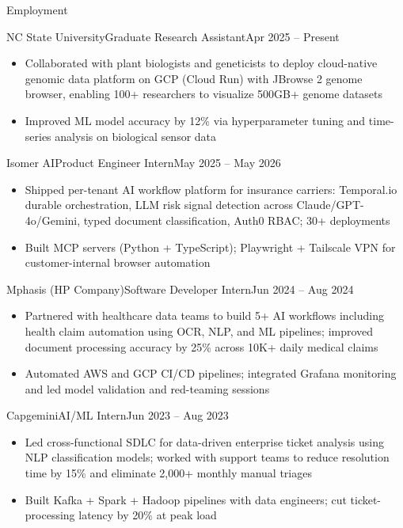 \documentclass{mcdowellcv}
\begin{document}
\fontsize{10}{12}\selectfont
\makeheader

\begin{cvsection}{Employment}

  \begin{cvsubsection}{NC State University}{Graduate Research Assistant}{Apr 2025 -- Present}
    \begin{itemize}
      \item Collaborated with plant biologists and geneticists to deploy cloud-native genomic data platform on GCP (Cloud Run) with JBrowse 2 genome browser, enabling 100+ researchers to visualize 500GB+ genome datasets
      \item Improved ML model accuracy by 12\% via hyperparameter tuning and time-series analysis on biological sensor data
    \end{itemize}
  \end{cvsubsection}

  \begin{cvsubsection}{Isomer AI}{Product Engineer Intern}{May 2025 -- May 2026}
    \begin{itemize}
      \item Shipped per-tenant AI workflow platform for insurance carriers: Temporal.io durable orchestration, LLM risk signal detection across Claude/GPT-4o/Gemini, typed document classification, Auth0 RBAC; 30+ deployments
      \item Built MCP servers (Python + TypeScript); Playwright + Tailscale VPN for customer-internal browser automation
    \end{itemize}
  \end{cvsubsection}

  \begin{cvsubsection}{Mphasis (HP Company)}{Software Developer Intern}{Jun 2024 -- Aug 2024}
    \begin{itemize}
      \item Partnered with healthcare data teams to build 5+ AI workflows including health claim automation using OCR, NLP, and ML pipelines; improved document processing accuracy by 25\% across 10K+ daily medical claims
      \item Automated AWS and GCP CI/CD pipelines; integrated Grafana monitoring and led model validation and red-teaming sessions
    \end{itemize}
  \end{cvsubsection}

  \begin{cvsubsection}{Capgemini}{AI/ML Intern}{Jun 2023 -- Aug 2023}
    \begin{itemize}
      \item Led cross-functional SDLC for data-driven enterprise ticket analysis using NLP classification models; worked with support teams to reduce resolution time by 15\% and eliminate 2,000+ monthly manual triages
      \item Built Kafka + Spark + Hadoop pipelines with data engineers; cut ticket-processing latency by 20\% at peak load
    \end{itemize}
  \end{cvsubsection}


\end{cvsection}
\end{document}
